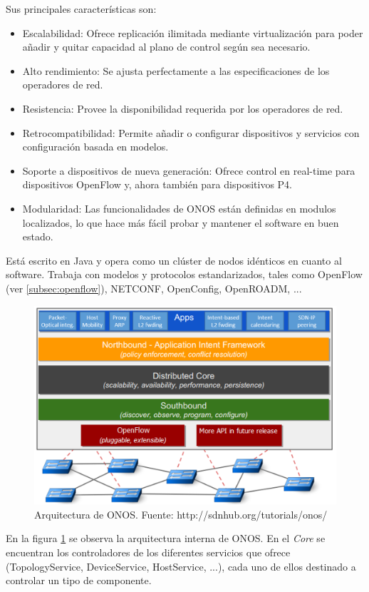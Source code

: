 Sus principales características son:
\begin{itemize}
	\item Escalabilidad: Ofrece replicación ilimitada mediante virtualización para poder añadir y quitar capacidad al plano de control según sea necesario.
	\item Alto rendimiento: Se ajusta perfectamente a las especificaciones de los operadores de red.
	\item Resistencia: Provee la disponibilidad requerida por los operadores de red.
	\item Retrocompatibilidad: Permite añadir o configurar dispositivos y servicios con configuración basada en modelos.
	\item Soporte a dispositivos de nueva generación: Ofrece control en real-time para dispositivos OpenFlow y, ahora también para dispositivos P4.
	\item Modularidad: Las funcionalidades de ONOS están definidas en modulos localizados, lo que hace más fácil probar y mantener el software en buen estado.
\end{itemize}

Está escrito en Java y opera como un clúster de nodos idénticos en cuanto al software. Trabaja con modelos y protocolos estandarizados, tales como OpenFlow (ver \ref{subsec:openflow}), NETCONF, OpenConfig, OpenROADM, ...

\begin{figure}[!ht]
	\centering
	\includegraphics[width=0.65\linewidth]{imagenes/onos_architecture}
	\caption{Arquitectura de ONOS. 
		Fuente: http://sdnhub.org/tutorials/onos/}
	\label{fig:onosarch}
\end{figure}

En la figura \ref{fig:onosarch} se observa la arquitectura interna de ONOS. En el \textit{Core} se encuentran los controladores de los diferentes servicios que ofrece (TopologyService, DeviceService, HostService, ...), cada uno de ellos destinado a controlar un tipo de componente.

